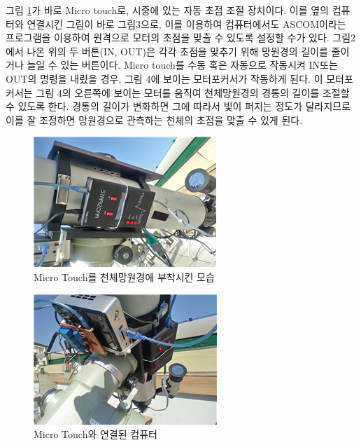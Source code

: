 \documentclass{abstract_hutech}
\begin{document}
그림 \ref{fig:telescope1}가 바로 Micro touch로, 시중에 있는 자동 초점 조절 장치이다. 이를 옆의 컴퓨터와 연결시킨 그림이 바로 그림3으로, 이를 이용하여 컴퓨터에서도 ASCOM이라는 프로그램을 이용하여 원격으로 모터의 초점을 맞출 수 있도록 설정할 수가 있다. 그림2에서 나온 위의 두 버튼(IN, OUT)은 각각 초점을 맞추기 위해 망원경의 길이를 줄이거나 늘일 수 있는 버튼이다. Micro touch를 수동 혹은 자동으로 작동시켜 IN또는 OUT의 명령을 내렸을 경우, 그림 4에 보이는 모터포커서가 작동하게 된다. 이 모터포커서는 그림 4의 오른쪽에 보이는 모터를 움직여 천체망원경의 경통의 길이를 조절할 수 있도록 한다. 경통의 길이가 변화하면 그에 따라서 빛이 퍼지는 정도가 달라지므로 이를 잘 조정하면 망원경으로 관측하는 천체의 초점을 맞출 수 있게 된다.

\begin{figure}[h]
	\centering
	\includegraphics[width=1\linewidth]{telescope1}
	\caption{Micro Touch를 천체망원경에 부착시킨 모습}
	\label{fig:telescope1}
\end{figure}

\begin{figure}[h]
	\centering
	\includegraphics[width=1\linewidth]{telescope2}
	\caption{Micro Touch와 연결된 컴퓨터}
	\label{fig:telescope2}
\end{figure}
\end{document}
